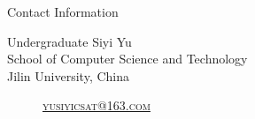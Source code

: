 \documentclass[
 size=14pt,
 paper=smartboard,  %
 mode=present, 		%
 display=slides, 	%
 style=tuliplab,  	%
 pauseslide,
 fleqn,leqno]{powerdot}
\begin{document}
\begin{wideslide}[toc=,bm=]{Contact Information}
\centering
{}
\twocolumn[
lcolwidth=0.35\linewidth,
rcolwidth=0.65\linewidth
]
{
}
{
Undergraduate Siyi Yu\\
School of Computer Science and Technology\\
Jilin University, China
\begin{description}
 \item[\textcolor{orange}{\faEnvelope}] \href{mailto:yusiyicsat@163.com}
 {\textsc{\footnotesize{yusiyicsat@163.com}}}

\end{description}
}
\end{wideslide}
\end{document}
